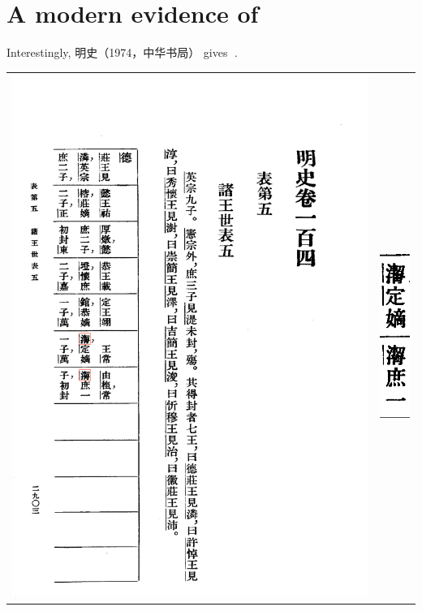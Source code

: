 \documentclass{article}
\begin{document}
\section{A modern evidence of 𰝙}

Interestingly, 明史（1974，中华书局）\cite[p. 2903]{明史1974} gives 𰝙.

\begin{center}
    \begin{tabular}{ c c }
        \includegraphics[height=.8\textheight]{002.png} & \includegraphics[]{002-crop.png}
    \end{tabular}
    \label{mingshi1974}
\end{center}
\end{document}
